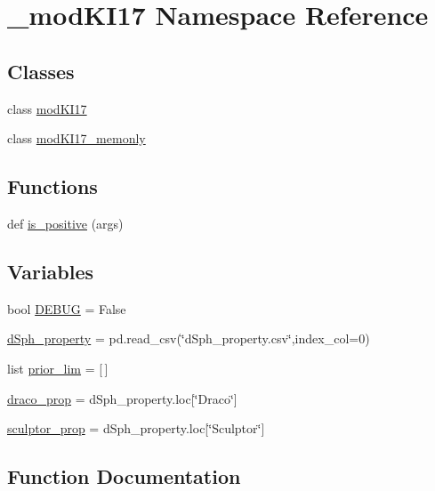 \hypertarget{namespace__modKI17}{}\section{\+\_\+mod\+K\+I17 Namespace Reference}
\label{namespace__modKI17}
\subsection*{Classes}
\begin{DoxyCompactItemize}
\item 
class \hyperlink{class__modKI17_1_1modKI17}{mod\+K\+I17}
\item 
class \hyperlink{class__modKI17_1_1modKI17__memonly}{mod\+K\+I17\+\_\+memonly}
\end{DoxyCompactItemize}
\subsection*{Functions}
\begin{DoxyCompactItemize}
\item 
def \hyperlink{namespace__modKI17_a445649df2eb1a8d89151f0327577bdce}{is\+\_\+positive} (args)
\end{DoxyCompactItemize}
\subsection*{Variables}
\begin{DoxyCompactItemize}
\item 
bool \hyperlink{namespace__modKI17_ae2b828e5fde2856ec9c553d1bb68975e}{D\+E\+B\+UG} = False
\item 
\hyperlink{namespace__modKI17_a1dc0b70b70de3db7377d1a3a6f92871a}{d\+Sph\+\_\+property} = pd.\+read\+\_\+csv(\char`\"{}d\+Sph\+\_\+property.\+csv\char`\"{},index\+\_\+col=0)
\item 
list \hyperlink{namespace__modKI17_a41888ff5544dc7ffbf48470ca2274d5d}{prior\+\_\+lim} = \mbox{[}$\,$\mbox{]}
\item 
\hyperlink{namespace__modKI17_a7f903fd3e65a639eca726d9f0bcfaa9d}{draco\+\_\+prop} = d\+Sph\+\_\+property.\+loc\mbox{[}\char`\"{}Draco\char`\"{}\mbox{]}
\item 
\hyperlink{namespace__modKI17_a1230991826227dbc38455a1297294f77}{sculptor\+\_\+prop} = d\+Sph\+\_\+property.\+loc\mbox{[}\char`\"{}Sculptor\char`\"{}\mbox{]}
\end{DoxyCompactItemize}


\subsection{Function Documentation}
\mbox{\label{namespace__modKI17_a445649df2eb1a8d89151f0327577bdce}} 
